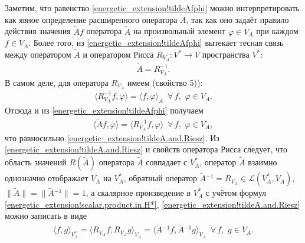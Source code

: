 \documentclass{report}
\begin{document}
Заметим, что равенство \eqref{energetic_extension!tildeAfphi} можно интерпретировать как явное определение расширенного оператора $\tilde{A}$, так как оно задаёт правило действия значения
$\tilde{A}f$ оператора $\tilde{A}$ на произвольный элемент $\varphi\in V_A$ при каждом $f\in V_A$. Более того, из \eqref{energetic_extension!tildeAfphi} вытекает тесная связь между
оператором $\tilde{A}$ и оператором Рисса $R_{V_A}:V^*\to V$ пространства $V^*$:
\begin{gather}\label{energetic_extension!tildeA.and.Riesz}
\tilde{A}=R^{-1}_{V_A}.
\end{gather}
В самом деле, для оператора $R_{V_A}$ имеем (свойство 5)):
\begin{gather*}
\langle R_{V_A}^{-1}f,\varphi\rangle=\langle f,\varphi\rangle_A\,\,\,\forall\,f,\,\,\varphi\in V_A.
\end{gather*}
Отсюда и из \eqref{energetic_extension!tildeAfphi} получаем
\begin{gather*}
\langle \tilde{A}f,\varphi\rangle=\langle R_{V_A}^{-1}f,\varphi\rangle\,\,\,\forall\,f,\,\,\varphi\in V_A,
\end{gather*}
что равносильно \eqref{energetic_extension!tildeA.and.Riesz}. Из \eqref{energetic_extension!tildeA.and.Riesz} и свойств оператора Рисса следует, что область значений $R(\tilde{A})$
оператора $\tilde{A}$ совпадает с $V^*_A$, оператор $\tilde{A}$ взаимно однозначно отображает $V_A$ на $V_A^*$, обратный оператор $\tilde{A}{}^{-1}=R_{V_A}\in\mathcal{L}(V^*_A,V_A)$,
$\|\tilde{A}\|=\|\tilde{A}{}^{-1}\|=1$, а скалярное произведение в $V_A^*$ с учётом формул \eqref{energetic_extension!scalar.product.in.H*}, \eqref{energetic_extension!tildeA.and.Riesz}
можно записать в виде
\begin{gather*}
\langle f,g\rangle_{V^*_A}=\langle R_{V_A}f,R_{V_A}g\rangle_{V_A}=\langle\tilde{A}{}^{-1}f,\tilde{A}{}^{-1}g\rangle_{V_A}\,\,\,\forall\,f,\,\,g\in V_A.
\end{gather*}
\end{document}
